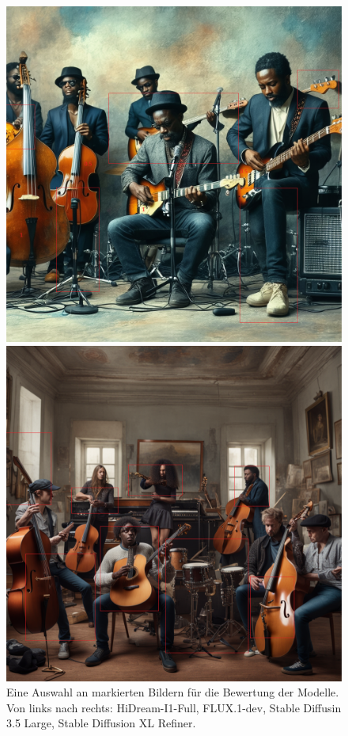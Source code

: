 \begin{figure}
\begin{minipage}{0.24\textwidth}
    \end{minipage}
    \begin{minipage}{0.24\textwidth}
        \centering
        \includegraphics[width=\textwidth]{bilder/sd35_prompt-0_guidance-5.5_steps-28.png}
    \end{minipage}
    \begin{minipage}{0.24\textwidth}
        \centering
        \includegraphics[width=\textwidth]{bilder/sdxlrefiner_prompt-0_guidance-9.5_steps-40.png}
    \end{minipage}
    \caption{Eine Auswahl an markierten Bildern für die Bewertung der Modelle. Von links nach rechts: HiDream-I1-Full, FLUX.1-dev, Stable Diffusin 3.5 Large, Stable Diffusion XL Refiner.}
    \label{fig:marked_images}
\end{figure}

